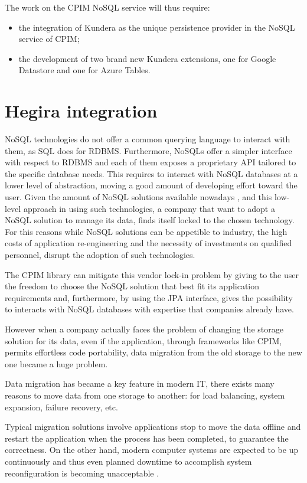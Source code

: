 \newparagraph The work on the CPIM NoSQL service will thus require:
\begin{itemize}
\item the integration of Kundera as the unique persistence provider in the NoSQL service of CPIM;
\item the development of two brand new Kundera extensions, one for Google Datastore and one for Azure Tables.
\end{itemize}

\section{Hegira integration}
NoSQL technologies do not offer a common querying language to interact with them, as SQL does for RDBMS. Furthermore, NoSQLs offer a simpler interface with respect to RDBMS and each of them exposes a proprietary API tailored to the specific database needs. This requires to interact with NoSQL databases at a lower level of abstraction, moving a good amount of developing effort toward the user.
Given the amount of NoSQL solutions available nowadays \cite{online:nosql-database.org}, and this low-level approach in using such technologies, a company that want to adopt a NoSQL solution to manage its data, finds itself locked to the chosen technology. 
For this reasons while NoSQL solutions can be appetible to industry, the high costs of application re-engineering and the necessity of investments on qualified personnel, disrupt the adoption of such technologies.

\noindent The CPIM library can mitigate this vendor lock-in problem by giving to the user the freedom to choose the NoSQL solution that best fit its application requirements and, furthermore, by using the JPA interface, gives the possibility to interacts with NoSQL databases with expertise that companies already have.

\noindent However when a company actually faces the problem of changing the storage solution for its data, even if the application, through frameworks like CPIM, permits effortless code portability, data migration from the old storage to the new one became a huge problem. 

\newparagraph Data migration has became a key feature in modern IT, there exists many reasons to move data from one storage to another: for load balancing, system expansion, failure recovery, etc.

\noindent Typical migration solutions involve applications stop to move the data offline and restart the application when the process has been completed, to guarantee the correctness. On the other hand, modern computer systems are expected to be up continuously and thus even planned downtime to accomplish system reconfiguration is becoming unacceptable \cite{paper:hitachi}.

